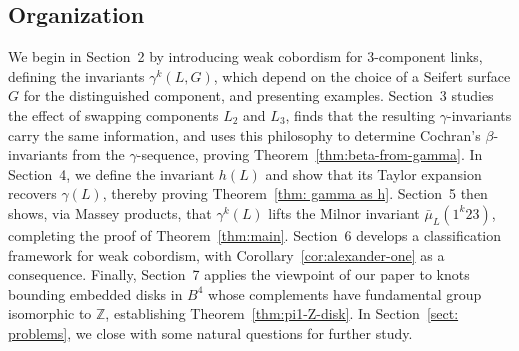 \documentclass[a4paper, 11pt]{amsart}
\theoremstyle{definition}
\newcommand{\Z}{\mathbb{Z}}
\newcommand{\noteta}{h}
\begin{document}

\subsection*{Organization}
We begin in Section~2 by introducing weak cobordism for $3$-component links, defining the invariants $\gamma^k(L,G)$, which depend on the choice of a Seifert surface $G$ for the distinguished component, and presenting examples. Section~3 studies 
the effect of swapping components $L_2$ and $L_3$, finds that the resulting $\gamma$-invariants carry the same information, and uses this philosophy to determine Cochran's $\beta$-invariants from the $\gamma$-sequence,
proving Theorem~\ref{thm:beta-from-gamma}. In Section~4, we define the invariant $h(L)$ and show that its Taylor expansion recovers $\gamma(L)$, thereby proving Theorem~\ref{thm: gamma as h}. Section~5 then shows, via Massey products, that $\gamma^k(L)$ lifts the Milnor invariant $\bar{\mu}_L(1^k23)$, completing the proof of Theorem~\ref{thm:main}. Section~6 develops a classification framework for weak cobordism,  with Corollary~\ref{cor:alexander-one} as a consequence. Finally, Section~7 applies the viewpoint of our paper to knots bounding embedded disks in $B^4$ whose complements have fundamental group isomorphic to $\mathbb{Z}$, establishing Theorem~\ref{thm:pi1-Z-disk}.  In Section~\ref{sect: problems}, we close with some natural questions for further study.  
\end{document}

